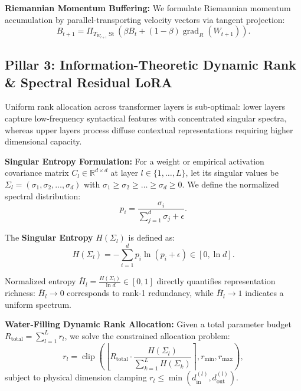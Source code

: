 \textbf{Riemannian Momentum Buffering:} We formulate Riemannian momentum accumulation by parallel-transporting velocity vectors via tangent projection:
\begin{equation}
B_{t+1} = \Pi_{T_{W_{t+1}} \operatorname{St}}\left( \beta B_t + (1 - \beta) \operatorname{grad}_R(W_{t+1}) \right).
\end{equation}


\subsection{Pillar 3: Information-Theoretic Dynamic Rank \& Spectral Residual LoRA}
\label{sec:dynamic_rank}

Uniform rank allocation across transformer layers is sub-optimal: lower layers capture low-frequency syntactical features with concentrated singular spectra, whereas upper layers process diffuse contextual representations requiring higher dimensional capacity.

\textbf{Singular Entropy Formulation:} For a weight or empirical activation covariance matrix $C_l \in \mathbb{R}^{d \times d}$ at layer $l \in \{1, \dots, L\}$, let its singular values be $\Sigma_l = (\sigma_1, \sigma_2, \dots, \sigma_d)$ with $\sigma_1 \ge \sigma_2 \ge \dots \ge \sigma_d \ge 0$. We define the normalized spectral distribution:
\begin{equation}
p_i = \frac{\sigma_i}{\sum_{j=1}^d \sigma_j + \epsilon}.
\end{equation}

The \textbf{Singular Entropy} $H(\Sigma_l)$ is defined as:
\begin{equation}
\label{eq:singular_entropy}
H(\Sigma_l) = -\sum_{i=1}^d p_i \ln(p_i + \epsilon) \in [0, \ln d].
\end{equation}

Normalized entropy $\bar{H}_l = \frac{H(\Sigma_l)}{\ln d} \in [0, 1]$ directly quantifies representation richness: $\bar{H}_l \to 0$ corresponds to rank-1 redundancy, while $\bar{H}_l \to 1$ indicates a uniform spectrum.

\textbf{Water-Filling Dynamic Rank Allocation:} Given a total parameter budget $R_{\text{total}} = \sum_{l=1}^L r_l$, we solve the constrained allocation problem:
\begin{equation}
r_l = \operatorname{clip}\left( \left\lfloor R_{\text{total}} \cdot \frac{H(\Sigma_l)}{\sum_{k=1}^L H(\Sigma_k)} \right\rceil, r_{\min}, r_{\max} \right),
\end{equation}
subject to physical dimension clamping $r_l \le \min(d_{\text{in}}^{(l)}, d_{\text{out}}^{(l)})$.

